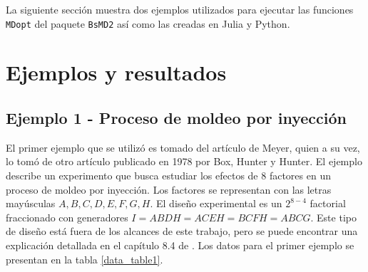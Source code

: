 La siguiente sección muestra dos ejemplos utilizados para ejecutar las funciones \texttt{MDopt} del paquete \texttt{BsMD2} así como las creadas en \textsf{Julia} y \textsf{Python}. 

\section{Ejemplos y resultados}

\subsection{Ejemplo 1 - Proceso de moldeo por inyección}

El primer ejemplo que se utilizó es tomado del artículo de Meyer, quien a su vez, lo tomó de otro artículo publicado en 1978 por Box, Hunter y Hunter. El ejemplo describe un experimento que busca estudiar los efectos de 8 factores en un proceso de moldeo por inyección. Los factores se representan con las letras mayúsculas $A, B, C, D, E, F, G, H$. El diseño experimental es un $2^{8-4}$ factorial fraccionado con generadores $I = ABDH = ACEH = BCFH = ABCG$. Este tipo de diseño está fuera de los alcances de este trabajo, pero se puede encontrar una explicación detallada en el capítulo 8.4 de \cite{montgomery2017design}. Los datos para el primer ejemplo se presentan en la tabla \ref{data_table1}. 

